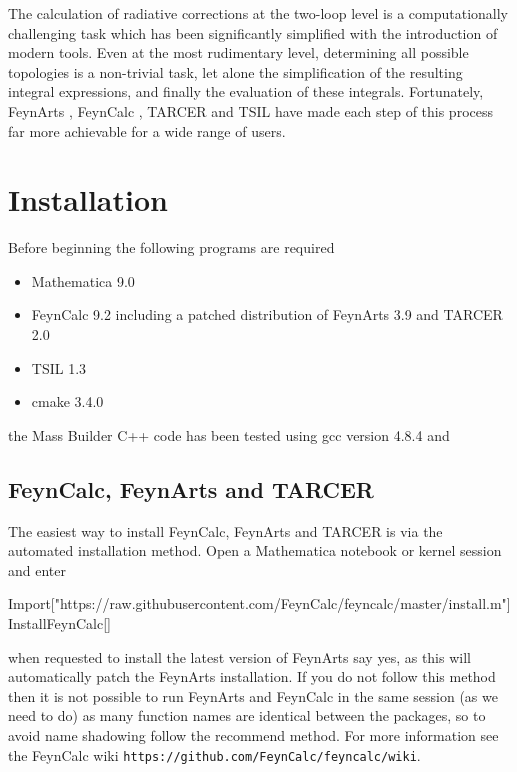 The calculation of radiative corrections at the two-loop level is a computationally challenging task which has been significantly simplified with the introduction of modern tools.  Even at the most rudimentary level, determining all possible topologies is a non-trivial task, let alone the simplification of the resulting integral expressions, and finally the evaluation of these integrals.  Fortunately, FeynArts \cite{Hahn2000}, FeynCalc \cite{Mertig1991,Shtabovenko2016}, TARCER \cite{Mertig1998} and TSIL \cite{Martin2006} have made each step of this process far more achievable for a wide range of users.

\section{Installation}

Before beginning the following programs are required
\begin{itemize}
\item Mathematica 9.0
\item FeynCalc 9.2 including a patched distribution of FeynArts 3.9 and TARCER 2.0
\item TSIL 1.3
\item cmake 3.4.0
\end{itemize}
the Mass Builder C++ code has been tested using gcc version 4.8.4 and 

\subsection{FeynCalc, FeynArts and TARCER}

The easiest way to install FeynCalc, FeynArts and TARCER is via the automated installation method.  Open a Mathematica notebook or kernel session and enter
\begin{lstterm}
Import["https://raw.githubusercontent.com/FeynCalc/feyncalc/master/install.m"]
InstallFeynCalc[]
\end{lstterm}

when requested to install the latest version of FeynArts say yes, as this will automatically patch the FeynArts installation.  If you do not follow this method then it is not possible to run FeynArts and FeynCalc in the same session (as we need to do) as many function names are identical between the packages, so to avoid name shadowing follow the recommend method.  For more information see the FeynCalc wiki \lstinline{https://github.com/FeynCalc/feyncalc/wiki}.

